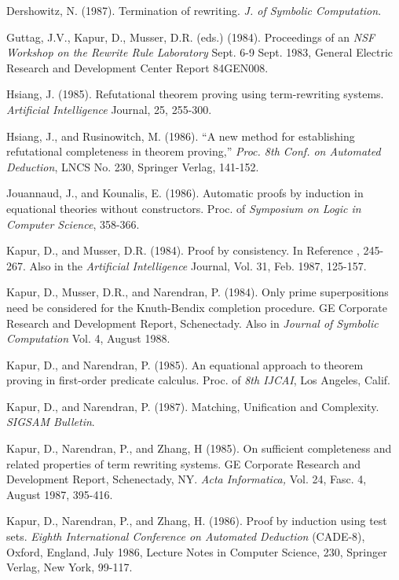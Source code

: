 \begin{thebibliography}{99}

Dershowitz, N. (1987). Termination of rewriting.
{\sl J. of Symbolic Computation}.

Guttag, J.V., Kapur, D., Musser, D.R. (eds.)
(1984).  Proceedings of an {\sl NSF Workshop on the Rewrite Rule
Laboratory} Sept. 6-9 Sept. 1983, General Electric Research and
Development Center Report 84GEN008.

Hsiang, J. (1985). Refutational theorem proving
using term-rewriting systems. {\sl Artificial Intelligence} Journal,
25, 255-300.

 Hsiang, J., and Rusinowitch, M. (1986). ``A new method for 
establishing refutational completeness in theorem proving,''
{\sl Proc. 8th Conf. on Automated Deduction},
LNCS No. 230, Springer Verlag, 141-152.

Jouannaud, J., and Kounalis, E. (1986).
Automatic proofs by induction in equational theories without
constructors.  Proc. of {\sl Symposium on Logic in Computer Science},
358-366.

Kapur, D., and Musser, D.R. (1984). Proof by
consistency.  In Reference \cite{Guttagetal84}, 245-267.
Also in the {\it
Artificial Intelligence} Journal, Vol. 31, Feb. 1987, 125-157. 

Kapur, D., Musser, D.R., and Narendran, P. (1984). Only
prime superpositions need be considered for the Knuth-Bendix
completion procedure.  GE Corporate Research
and Development Report, Schenectady.  Also in {\it Journal of Symbolic Computation} Vol. 4, August 1988.
 
Kapur, D., and Narendran, P. (1985).
An equational approach to theorem proving
in first-order predicate calculus. Proc. of {\sl 8th IJCAI},
Los Angeles, Calif.

 Kapur, D., and Narendran, P. (1987). Matching, Unification and
Complexity. {\it SIGSAM Bulletin}.

Kapur, D., Narendran, P., and Zhang, H (1985). On
sufficient completeness and related properties of term rewriting
systems.  GE Corporate Research and Development Report, Schenectady,
NY.  {\it Acta Informatica,} Vol. 24, Fasc. 4, August 1987, 395-416.

Kapur, D., Narendran, P., and Zhang, H. (1986). Proof
by induction using test sets. {\sl
Eighth International Conference on
Automated Deduction} (CADE-8), Oxford, England, July 1986, 
Lecture Notes in Computer Science, 230, Springer Verlag, 
New York, 99-117.


\end{thebibliography}
